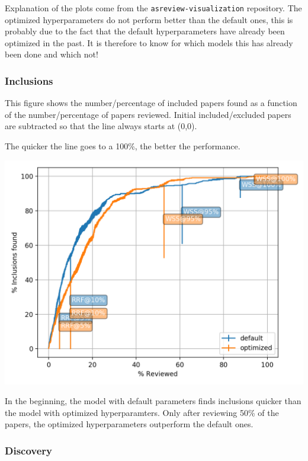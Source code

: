 \documentclass[
]{book}
\begin{document}
Explanation of the plots come from the \texttt{asreview-visualization} repository.
The optimized hyperparameters do not perform better than the default ones, this is probably due to the fact that the default hyperparameters have already been optimized in the past. It is therefore to know for which models this has already been done and which not!

\pagebreak

\hypertarget{inclusions}{%
\subsubsection{Inclusions}\label{inclusions}}

This figure shows the number/percentage of included papers found as a function of the
number/percentage of papers reviewed. Initial included/excluded papers are subtracted so that the line
always starts at (0,0).

The quicker the line goes to a 100\%, the better the performance.

\includegraphics{figs/myfirstsim/Figure_1.png}

In the beginning, the model with default parameters finds inclusions quicker than the model with optimized hyperparamters.
Only after reviewing 50\% of the papers, the optimized hyperparameters outperform the default ones.

\pagebreak

\hypertarget{discovery}{%
\subsubsection{Discovery}\label{discovery}}
\end{document}
